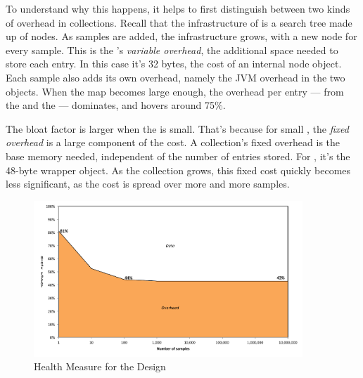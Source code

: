 
To understand why this happens, it helps to first distinguish between two
kinds of overhead in collections. Recall that the infrastructure of
 is a search tree made up of nodes. As samples are added, the infrastructure grows,
with a new node for every sample. This is
the 's \emph{variable overhead}, the additional
space needed to store each entry. In this case it's 32 bytes,
the cost of an internal node object. Each sample also adds its own overhead,
namely the JVM overhead in the two  objects. When the map becomes large enough,
the overhead per entry --- from the  and the
 --- dominates, and hovers around 75\%.

The bloat factor is larger when the  is small. That's because for
small , the \emph{fixed overhead}
is a large component of the cost. A collection's fixed overhead is the base
memory needed, independent of the number of entries stored. For
, it's the 48-byte  wrapper object.
As the collection grows, this fixed cost quickly becomes less significant, as
the cost is spread over more and more samples.


\begin{figure}
  \centering
   \includegraphics[width=0.9\textwidth]{part1/Figures/memoryhealth/scalable-health-arraylist}
  \caption{Health Measure for the  Design }
  \label{fig:scalable-health-arraylist}
\end{figure}

